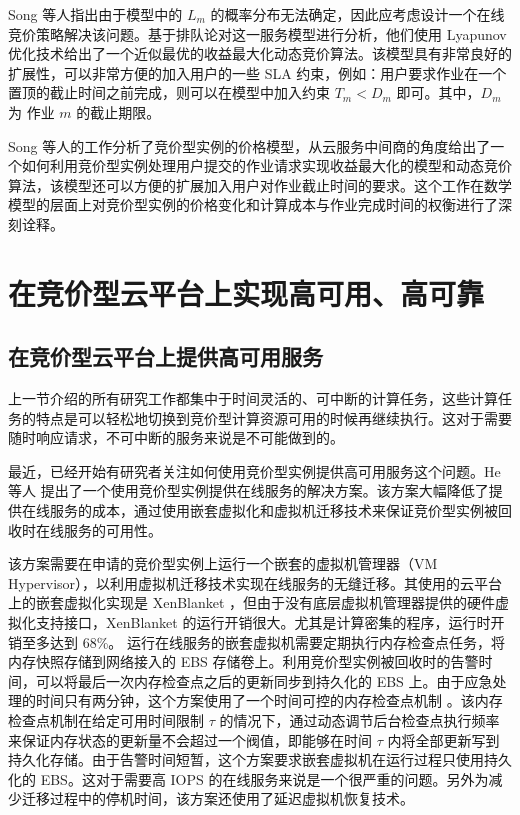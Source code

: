 Song 等人指出由于模型中的 $L_m$ 的概率分布无法确定，因此应考虑设计一个在线竞价策略解决该问题。基于排队论对这一服务模型进行分析，他们使用 Lyapunov 优化技术给出了一个近似最优的收益最大化动态竞价算法。该模型具有非常良好的扩展性，可以非常方便的加入用户的一些 SLA 约束，例如：用户要求作业在一个置顶的截止时间之前完成，则可以在模型中加入约束 $T_m < D_m$ 即可。其中，$D_m$ 为 作业 $m$ 的截止期限。

Song 等人的工作分析了竞价型实例的价格模型，从云服务中间商的角度给出了一个如何利用竞价型实例处理用户提交的作业请求实现收益最大化的模型和动态竞价算法，该模型还可以方便的扩展加入用户对作业截止时间的要求。这个工作在数学模型的层面上对竞价型实例的价格变化和计算成本与作业完成时间的权衡进行了深刻诠释。

\section{在竞价型云平台上实现高可用、高可靠}
\subsection{在竞价型云平台上提供高可用服务}
上一节介绍的所有研究工作都集中于时间灵活的、可中断的计算任务，这些计算任务的特点是可以轻松地切换到竞价型计算资源可用的时候再继续执行。这对于需要随时响应请求，不可中断的服务来说是不可能做到的。

最近，已经开始有研究者关注如何使用竞价型实例提供高可用服务这个问题。He 等人 \cite{He:2015:CCH:2749246.2749275}  提出了一个使用竞价型实例提供在线服务的解决方案。该方案大幅降低了提供在线服务的成本，通过使用嵌套虚拟化和虚拟机迁移技术来保证竞价型实例被回收时在线服务的可用性。

该方案需要在申请的竞价型实例上运行一个嵌套的虚拟机管理器（VM Hypervisor），以利用虚拟机迁移技术实现在线服务的无缝迁移。其使用的云平台上的嵌套虚拟化实现是 XenBlanket \cite{Williams:2012:XVO:2168836.2168849}，但由于没有底层虚拟机管理器提供的硬件虚拟化支持接口，XenBlanket 的运行开销很大。尤其是计算密集的程序，运行时开销至多达到 68\%。 运行在线服务的嵌套虚拟机需要定期执行内存检查点任务，将内存快照存储到网络接入的 EBS 存储卷上。利用竞价型实例被回收时的告警时间，可以将最后一次内存检查点之后的更新同步到持久化的 EBS 上。由于应急处理的时间只有两分钟，这个方案使用了一个时间可控的内存检查点机制 \cite{Singh:2013:YEG:2482626.2482642}。该内存检查点机制在给定可用时间限制 $\tau$ 的情况下，通过动态调节后台检查点执行频率来保证内存状态的更新量不会超过一个阀值，即能够在时间 $\tau$ 内将全部更新写到持久化存储。由于告警时间短暂，这个方案要求嵌套虚拟机在运行过程只使用持久化的 EBS。这对于需要高 IOPS 的在线服务来说是一个很严重的问题。另外为减少迁移过程中的停机时间，该方案还使用了延迟虚拟机恢复技术。

